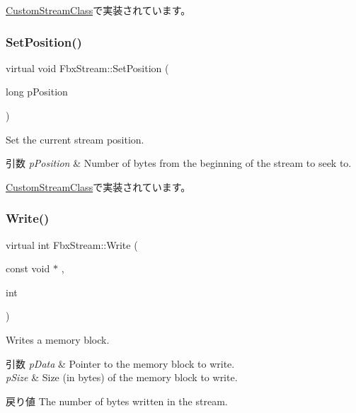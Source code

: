 \hyperlink{class_custom_stream_class_aa4b267f0e7bb68f020bf53ac3a7a316e}{Custom\+Stream\+Class}で実装されています。

\mbox{\label{class_fbx_stream_aeb8843a4daec9d82187cc3eea5bb9baa}} 
\subsubsection{\texorpdfstring{Set\+Position()}{SetPosition()}}
{\footnotesize\ttfamily virtual void Fbx\+Stream\+::\+Set\+Position (\begin{DoxyParamCaption}\item[{long}]{p\+Position }\end{DoxyParamCaption})\hspace{0.3cm}{\ttfamily [pure virtual]}}

Set the current stream position. 
\begin{DoxyParams}{引数}
{\em p\+Position} & Number of bytes from the beginning of the stream to seek to. \\
\hline
\end{DoxyParams}


\hyperlink{class_custom_stream_class_a93d790e1ed854c5383b7854719e2f2c8}{Custom\+Stream\+Class}で実装されています。

\mbox{\label{class_fbx_stream_a0bd0142e0acd244bc4342381c28b7a9a}} 
\subsubsection{\texorpdfstring{Write()}{Write()}\hspace{0.1cm}{\footnotesize\ttfamily [1/3]}}
{\footnotesize\ttfamily virtual int Fbx\+Stream\+::\+Write (\begin{DoxyParamCaption}\item[{const void $\ast$}]{,  }\item[{int}]{ }\end{DoxyParamCaption})\hspace{0.3cm}{\ttfamily [pure virtual]}}

Writes a memory block. 
\begin{DoxyParams}{引数}
{\em p\+Data} & Pointer to the memory block to write. \\
\hline
{\em p\+Size} & Size (in bytes) of the memory block to write. \\
\hline
\end{DoxyParams}
\begin{DoxyReturn}{戻り値}
The number of bytes written in the stream. 
\end{DoxyReturn}


